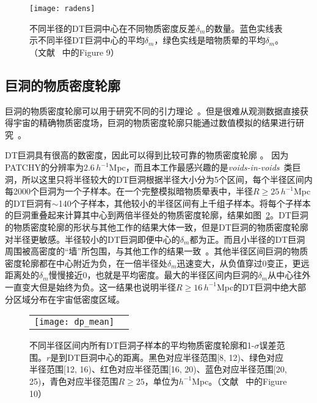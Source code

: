 \begin{figure}
\centering
\texttt{[image: radens]}
\caption{不同半径的DT巨洞中心在不同物质密度反差$\delta_m$的数量。蓝色实线表示不同半径DT巨洞中心的平均$\delta_m$，绿色实线是暗物质晕的平均$\delta_m$。（文献 ~中的Figure 9）}
\label{fig:radens}
\end{figure}

\subsection{巨洞的物质密度轮廓}

巨洞的物质密度轮廓可以用于研究不同的引力理论~\cite{Cai2015}。但是很难从观测数据直接获得宇宙的精确物质密度场，巨洞的物质密度轮廓只能通过数值模拟的结果进行研究~\cite{Colberg2005,Ricciardelli2013,Hamaus2014,Nadathur2015}。

DT巨洞具有很高的数密度，因此可以得到比较可靠的物质密度轮廓
。
因为\textsc{PATCHY}的分辨率为$2.6\,h^{-1}$Mpc，而且本工作最感兴趣的是\textit{voids-in-voids}~\cite{SW04}类巨洞，所以这里只将半径较大的DT巨洞根据半径大小分为5个区间，每个半径区间内每2000个巨洞为一个子样本。在一个完整模拟暗物质晕表中，半径$R \geq 25\,h^{-1}$Mpc的DT巨洞有$\sim$140个子样本，其他较小的半径区间有上千组子样本。将每个子样本的巨洞重叠起来计算其中心到两倍半径处的物质密度轮廓，结果如图~\ref{fig:dens_pro}。DT巨洞的物质密度轮廓的形状与其他工作的结果大体一致，但是DT巨洞的物质密度轮廓对半径更敏感。半径较小的DT巨洞即便中心的$\delta_m$都为正。而且小半径的DT巨洞周围被高密度的“墙”所包围，与其他工作的结果一致~\cite{Paz2013,Hamaus2014}。其他半径区间巨洞的物质密度轮廓都在中心附近为负，在一倍半径处$\delta_m$迅速变大，从负值穿过0变正，更远距离处的$\delta_m$慢慢接近0，也就是平均密度。最大的半径区间内巨洞的$\delta_m$从中心往外一直变大但是始终为负。这一结果也说明半径$R \geq 16\,h^{-1}$Mpc的DT巨洞中绝大部分区域分布在宇宙低密度区域。

\begin{figure}
\begin{tabular}{cc}
\texttt{[image: dp\_mean]}
\end{tabular}
\caption{不同半径区间内所有DT巨洞子样本的平均物质密度轮廓和1-$\sigma$误差范围。$r$是到DT巨洞中心的距离。黑色对应半径范围[8, 12)、绿色对应半径范围[12, 16)、红色对应半径范围[16, 20)、蓝色对应半径范围[20, 25)，青色对应半径范围$R \geq 25$，单位为$h^{-1}$Mpc。（文献 ~中的Figure 10）}
\label{fig:dens_pro}
\end{figure}

